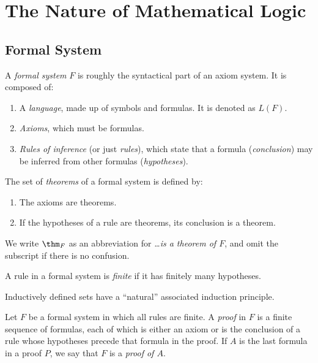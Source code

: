 \section{The Nature of Mathematical Logic}

\subsection{Formal System}

\begin{definition}
A \emph{formal system} $F$ is roughly the syntactical part of an axiom system. It is composed of:
\begin{enumerate}
    \item A \emph{language}, made up of symbols and formulas. It is denoted as $L(F)$.
    \item \emph{Axioms}, which must be formulas.
    \item \emph{Rules of inference} (or just \emph{rules}), which state that a formula (\emph{conclusion})
    may be inferred from other formulas (\emph{hypotheses}).
\end{enumerate}    
\end{definition}

\begin{definition}[Theorem]
    The set of \emph{theorems} of a formal system is defined by:
    \begin{enumerate}
        \item The axioms are theorems.
        \item If the hypotheses of a rule are theorems, its conclusion is a theorem.
    \end{enumerate}
    We write $\thm_F$ as an abbreviation for \emph{\dots is a theorem of $F$}, and omit 
    the subscript if there is no confusion.
\end{definition}

\begin{definition}
    A rule in a formal system is \emph{finite} if it has finitely many hypotheses.
\end{definition}

\begin{fact}
    Inductively defined sets have a ``natural'' associated induction principle.
\end{fact}

\begin{definition}[Proof]
    Let $F$ be a formal system in which all rules are finite. A \emph{proof} in $F$ is a finite sequence
    of formulas, each of which is either an axiom or is the conclusion of a rule whose hypotheses 
    precede that formula in the proof. If $A$ is the last formula in a proof $P$, we say that
    $F$ is a \emph{proof of $A$}. 
\end{definition}

